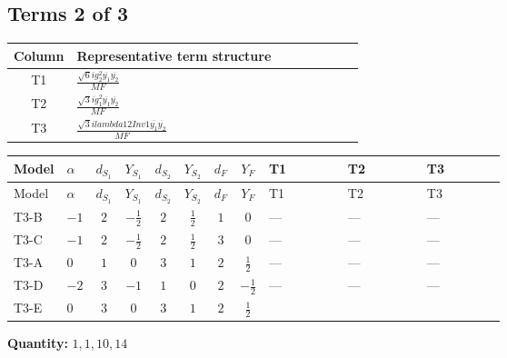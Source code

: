 \documentclass[8pt]{article}
\begin{document}
\begin{landscape}
\subsection*{Terms 2 of 3}
\begin{center}
\begin{tabular}{@{}c >{\raggedright\arraybackslash}p{0.82\linewidth}@{}}
\toprule
Column & Representative term structure \\
\midrule
T1 & \(\displaystyle \frac{\sqrt{6} i g_{2}^{2} \overline{y_{1}} \overline{y_{2}}}{MF}\) \\
\midrule
T2 & \(\displaystyle \frac{\sqrt{3} i g_{1}^{2} \overline{y_{1}} \overline{y_{2}}}{MF}\) \\
\midrule
T3 & \(\displaystyle \frac{\sqrt{3} i lambda12Inv1 \overline{y_{1}} \overline{y_{2}}}{MF}\) \\
\midrule
\bottomrule
\end{tabular}
\end{center}
\smallskip
\tiny
\begin{longtable}{@{}llcccccc >{\raggedright\arraybackslash}p{0.21\linewidth} >{\raggedright\arraybackslash}p{0.21\linewidth} >{\raggedright\arraybackslash}p{0.21\linewidth}@{}}
\toprule
Model & $\alpha$ & $d_{S_1}$ & $Y_{S_1}$ & $d_{S_2}$ & $Y_{S_2}$ & $d_F$ & $Y_F$ & T1 & T2 & T3 \\
\midrule
\endfirsthead
\toprule
Model & $\alpha$ & $d_{S_1}$ & $Y_{S_1}$ & $d_{S_2}$ & $Y_{S_2}$ & $d_F$ & $Y_F$ & T1 & T2 & T3 \\
\midrule
\endhead
T3-B & $-1$ & $2$ & $-\frac{1}{2}$ & $2$ & $\frac{1}{2}$ & $1$ & $0$ & --- & --- & --- \\
\midrule
T3-C & $-1$ & $2$ & $-\frac{1}{2}$ & $2$ & $\frac{1}{2}$ & $3$ & $0$ & --- & --- & --- \\
\midrule
T3-A & $0$ & $1$ & $0$ & $3$ & $1$ & $2$ & $\frac{1}{2}$ & --- & --- & --- \\
\midrule
T3-D & $-2$ & $3$ & $-1$ & $1$ & $0$ & $2$ & $-\frac{1}{2}$ & --- & --- & --- \\
\midrule
T3-E & $0$ & $3$ & $0$ & $3$ & $1$ & $2$ & $\frac{1}{2}$ & \scriptsize\adjustbox{max width=\linewidth}{$\begin{gathered} - \frac{\sqrt{6} i g_{2}^{2} \overline{y_{1}} \overline{y_{2}}}{3 MF}\end{gathered}$} & \scriptsize\adjustbox{max width=\linewidth}{$\begin{gathered} - \frac{\sqrt{3} i g_{1}^{2} \overline{y_{1}} \overline{y_{2}}}{8 MF}\end{gathered}$} & \scriptsize\adjustbox{max width=\linewidth}{$\begin{gathered} \frac{\sqrt{3} i lambda12Inv1 \overline{y_{1}} \overline{y_{2}}}{6 MF}\end{gathered}$} \\
\midrule
\bottomrule
\end{longtable}
\clearpage
\noindent\textbf{Quantity: }$\mathrm{1,1,10,14}$\par\smallskip

\end{landscape}
\end{document}
